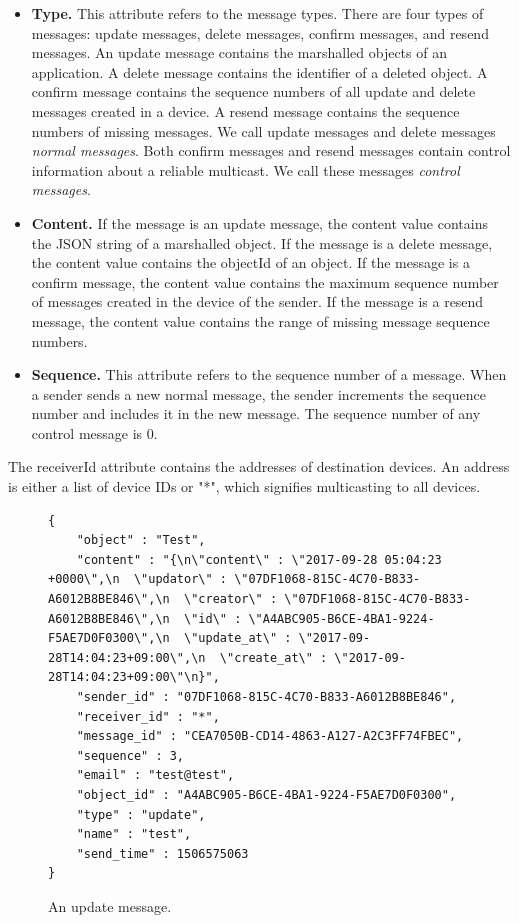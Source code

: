 \documentclass[a4paper,11pt]{report}
\begin{document}
\begin{itemize}[leftmargin=7mm]
	\setlength{\itemsep}{1pt}
	\setlength{\parskip}{0pt}
	\setlength{\parsep}{0pt}
	\item \textbf{Type.}
	This attribute refers to the message types.
	There are four types of messages: update messages, delete messages, confirm messages, and resend messages.
	An update message contains the marshalled objects of an application.
	A delete message contains the identifier of a deleted object.
	A confirm message contains the sequence numbers of all update and delete messages created in a device.
	A resend message contains the sequence numbers of missing messages.
	We call update messages and delete messages \emph{normal messages}. 
	Both confirm messages and resend messages contain control information about a reliable multicast. 
	We call these messages \emph{control messages}.
	\item \textbf{Content.} 
	If the message is an update message, the content value contains the JSON string of a marshalled object.
	If the message is a delete message, the content value contains the objectId of an object.
	If the message is a confirm message, the content value contains the maximum sequence number of messages created in the device of the sender.
	If the message is a resend message, the content value contains the range of missing message sequence numbers.
	\item \textbf{Sequence.}
	This attribute refers to the sequence number of a message.
	When a sender sends a new normal message, the sender increments the sequence number and includes it in the new message.
	The sequence number of any control message is 0.
\end{itemize}

The receiverId attribute contains the addresses of destination devices.
An address is either a list of device IDs or "*", which signifies multicasting to all devices.

\begin{figure}
\begin{lstlisting}[frame=none language=JSON] 
{
    "object" : "Test",
    "content" : "{\n\"content\" : \"2017-09-28 05:04:23 +0000\",\n  \"updator\" : \"07DF1068-815C-4C70-B833-A6012B8BE846\",\n  \"creator\" : \"07DF1068-815C-4C70-B833-A6012B8BE846\",\n  \"id\" : \"A4ABC905-B6CE-4BA1-9224-F5AE7D0F0300\",\n  \"update_at\" : \"2017-09-28T14:04:23+09:00\",\n  \"create_at\" : \"2017-09-28T14:04:23+09:00\"\n}",
    "sender_id" : "07DF1068-815C-4C70-B833-A6012B8BE846",
    "receiver_id" : "*",
    "message_id" : "CEA7050B-CD14-4863-A127-A2C3FF74FBEC",
    "sequence" : 3,
    "email" : "test@test",
    "object_id" : "A4ABC905-B6CE-4BA1-9224-F5AE7D0F0300",
    "type" : "update",
    "name" : "test",
    "send_time" : 1506575063
}		
\end{lstlisting}
\caption{An update message.}
\label{fig:grouper_message}
\end{figure}
\end{document}
